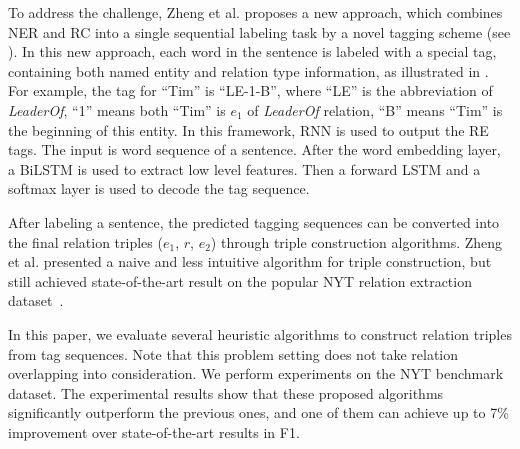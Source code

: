 To address the challenge, Zheng et al.  proposes a new approach,
which combines NER and RC into a single sequential labeling task by a novel
tagging scheme (see ).
In this new approach, each word in the sentence is labeled with a special tag,
containing both named entity and relation type information, as illustrated in
. For example, the tag for ``Tim'' is 
``LE-1-B'', where ``LE'' is the abbreviation of \textit{LeaderOf}, 
``1'' means both ``Tim'' is  $e_1$ of \textit{LeaderOf} relation, 
``B'' means ``Tim'' is the beginning of this entity.
In this framework, RNN is used to output the RE tags. 
The input is word sequence of a sentence. After the word
embedding layer, a BiLSTM is used to extract low level features. Then a forward
LSTM and a softmax layer is used to decode the tag sequence. 

After labeling a sentence, the predicted tagging sequences can be converted into 
the final relation triples ($e_1$, $r$, $e_2$) through triple 
construction algorithms. Zheng et al.  presented a naive
and less intuitive
algorithm for triple construction, but still achieved state-of-the-art result on
the popular NYT relation extraction dataset~\cite{Ren2017}.

In this paper, we evaluate several heuristic algorithms to construct relation
triples from tag sequences. Note that this problem setting does not take relation
overlapping into consideration. We perform experiments on the NYT benchmark dataset.
The experimental results show that these proposed algorithms
significantly outperform the previous ones, and one of them can achieve up to
7\% improvement over state-of-the-art results in F1.

